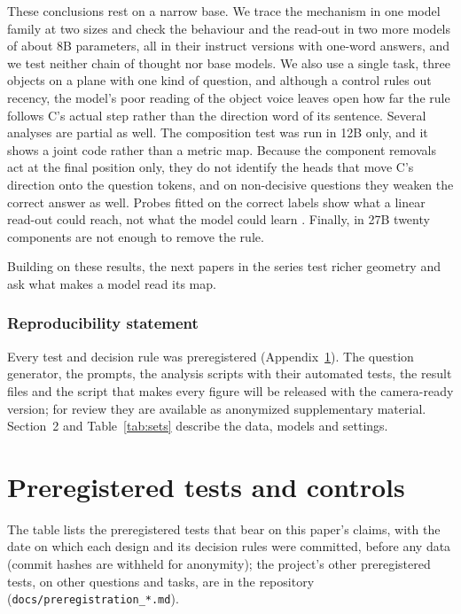 \documentclass[10pt]{article}
\begin{document}
These conclusions rest on a narrow base. We trace the mechanism in one model family at two sizes and check the behaviour and the read-out in two
more models of about 8B parameters, all in their instruct versions with one-word answers, and we test neither chain
of thought nor base models. We also use a single task, three objects on a
plane with one kind of question, and although a control rules out recency, the model's poor reading of the object voice leaves open how far the rule follows C's actual step rather than the direction word of its sentence.
Several analyses are partial as well. The composition test was run in 12B only, and it shows a joint code rather than a
metric map. Because the component removals act at the final position only, they do not identify the heads that move
C's direction onto the question tokens, and on non-decisive questions they weaken the correct answer as well. Probes
fitted on the correct labels show what a linear read-out could reach, not what the model could learn
\citep{hewitt2019control}. Finally, in 27B twenty components are not enough to remove the rule.

Building on these results, the next papers in the series test richer geometry and ask what makes a model read its map.

\subsubsection*{Reproducibility statement}
Every test and decision rule was preregistered (Appendix~\ref{app:prereg}). The question generator, the prompts, the
analysis scripts with their automated tests, the result files and the script that makes every figure will be released
with the camera-ready version; for review they are available as anonymized supplementary material. Section~2 and
Table~\ref{tab:sets} describe the data, models and settings.




\appendix
\section{Preregistered tests and controls}\label{app:prereg}
The table lists the preregistered tests that bear on this paper's claims, with the date on which each design and its
decision rules were committed, before any data (commit hashes are withheld for anonymity); the project's other preregistered tests, on other questions and tasks, are in the
repository (\texttt{docs/preregistration\_*.md}).
\end{document}
